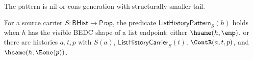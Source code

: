 \begin{definition}
\label{def:list-pattern-specification}
The pattern is nil-or-cons generation with structurally smaller tail.
\end{definition}

\begin{definition}
\label{def:list-history-pattern}
For a source carrier $S:\mathsf{BHist}\to\mathsf{Prop}$, the predicate
$\mathsf{ListHistoryPattern}_S(h)$ holds when $h$ has the visible BEDC shape of
a list endpoint: either $\hsame(h,\emp)$, or there are histories $a,t,p$ with
$S(a)$, $\mathsf{ListHistoryCarrier}_S(t)$, $\ContR(a,t,p)$, and
$\hsame(h,\Eone(p))$.
\end{definition}
